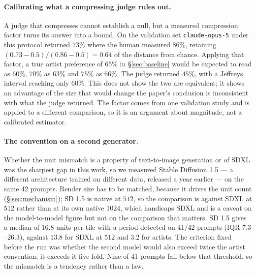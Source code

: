 \documentclass{article}
\begin{document}
\paragraph{Calibrating what a compressing judge rules out.} A judge that
compresses cannot establish a null, but a measured compression factor turns
its answer into a bound. On the validation set \texttt{claude-opus-5} under
this protocol returned $73\%$ where the human measured $86\%$, retaining
$(0.73-0.5)/(0.86-0.5) = 0.64$ of the distance from chance. Applying that
factor, a true artist preference of $65\%$ in \S\ref{sec:baseline} would be
expected to read as $60\%$, $70\%$ as $63\%$ and $75\%$ as $66\%$. The judge
returned $45\%$, with a Jeffreys interval reaching only $60\%$. This does not
show the two are equivalent; it shows an advantage of the size that would
change the paper's conclusion is inconsistent with what the judge returned.
The factor comes from one validation study and is applied to a different
comparison, so it is an argument about magnitude, not a calibrated estimator.

\paragraph{The convention on a second generator.} Whether the unit mismatch
is a property of text-to-image generation or of SDXL was the sharpest gap in
this work, so we measured Stable Diffusion 1.5 --- a different architecture
trained on different data, released a year earlier --- on the same 42 prompts.
Render size has to be matched, because it drives the unit count
(\S\ref{sec:mechanism}); SD 1.5 is native at $512$, so the comparison is
against SDXL at $512$ rather than at its own native $1024$, which handicaps
SDXL and is a caveat on the model-to-model figure but not on the comparison
that matters. SD 1.5 gives a median of $16.8$ units per tile with a period
detected on $41/42$ prompts (IQR $7.3$--$26.3$), against $13.8$ for SDXL at
$512$ and $3.2$ for artists. The criterion fixed before the run was whether
the second model would also exceed twice the artist convention; it exceeds it
five-fold. Nine of 41 prompts fall below that threshold, so the mismatch is a
tendency rather than a law.
\end{document}
